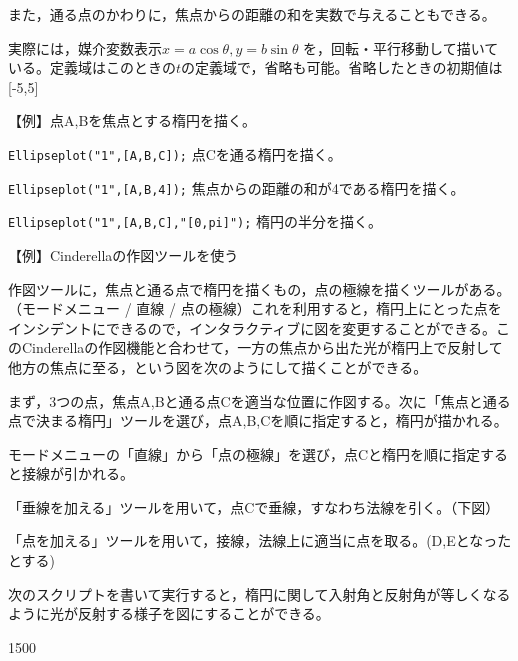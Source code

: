 \documentclass[papersize,a4paper,12pt,uplatex]{jsarticle}
\begin{document}
\begin{description}
また，通る点のかわりに，焦点からの距離の和を実数で与えることもできる。

実際には，媒介変数表示$x=a \cos \theta,y=b \sin \theta$ を，回転・平行移動して描いている。定義域はこのときの$t$の定義域で，省略も可能。省略したときの初期値は[-5,5]

\vspace{\baselineskip}
【例】点A,Bを焦点とする楕円を描く。

\verb|Ellipseplot("1",[A,B,C]);| 点Cを通る楕円を描く。

\verb|Ellipseplot("1",[A,B,4]);| 焦点からの距離の和が4である楕円を描く。

\verb|Ellipseplot("1",[A,B,C],"[0,pi]");| 楕円の半分を描く。

\vspace{\baselineskip}
【例】Cinderellaの作図ツールを使う

作図ツールに，焦点と通る点で楕円を描くもの，点の極線を描くツールがある。（モードメニュー / 直線 / 点の極線）これを利用すると，楕円上にとった点をインシデントにできるので，インタラクティブに図を変更することができる。このCinderellaの作図機能と合わせて，一方の焦点から出た光が楕円上で反射して他方の焦点に至る，という図を次のようにして描くことができる。

まず，3つの点，焦点A,Bと通る点Cを適当な位置に作図する。次に「焦点と通る点で決まる楕円」ツールを選び，点A,B,Cを順に指定すると，楕円が描かれる。

モードメニューの「直線」から「点の極線」を選び，点Cと楕円を順に指定すると接線が引かれる。

「垂線を加える」ツールを用いて，点Cで垂線，すなわち法線を引く。（下図）

「点を加える」ツールを用いて，接線，法線上に適当に点を取る。(D,Eとなったとする)

次のスクリプトを書いて実行すると，楕円に関して入射角と反射角が等しくなるように光が反射する様子を図にすることができる。
\newpage

\vspace{\baselineskip}
\begin{layer}{150}{0}
\end{layer}
\hspace{50mm}


\end{description}
\end{document}
